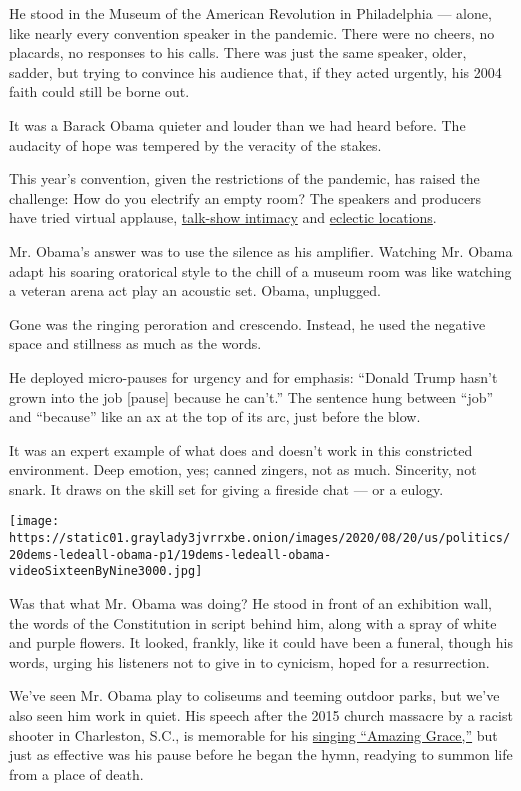 He stood in the Museum of the American Revolution in Philadelphia ---
alone, like nearly every convention speaker in the pandemic. There were
no cheers, no placards, no responses to his calls. There was just the
same speaker, older, sadder, but trying to convince his audience that,
if they acted urgently, his 2004 faith could still be borne out.

It was a Barack Obama quieter and louder than we had heard before. The
audacity of hope was tempered by the veracity of the stakes.

This year's convention, given the restrictions of the pandemic, has
raised the challenge: How do you electrify an empty room? The speakers
and producers have tried virtual applause,
\href{https://www.nytimes3xbfgragh.onion/2020/08/18/arts/television/dnc-michelle-obama.html}{talk-show
intimacy} and
\href{https://www.nytimes3xbfgragh.onion/2020/08/19/arts/television/dnc-roll-call-vote.html}{eclectic
locations}.

Mr. Obama's answer was to use the silence as his amplifier. Watching Mr.
Obama adapt his soaring oratorical style to the chill of a museum room
was like watching a veteran arena act play an acoustic set. Obama,
unplugged.

Gone was the ringing peroration and crescendo. Instead, he used the
negative space and stillness as much as the words.

He deployed micro-pauses for urgency and for emphasis: ``Donald Trump
hasn't grown into the job {[}pause{]} because he can't.'' The sentence
hung between ``job'' and ``because'' like an ax at the top of its arc,
just before the blow.

It was an expert example of what does and doesn't work in this
constricted environment. Deep emotion, yes; canned zingers, not as much.
Sincerity, not snark. It draws on the skill set for giving a fireside
chat --- or a eulogy.

\texttt{[image: https://static01.graylady3jvrrxbe.onion/images/2020/08/20/us/politics/20dems-ledeall-obama-p1/19dems-ledeall-obama-videoSixteenByNine3000.jpg]}

Was that what Mr. Obama was doing? He stood in front of an exhibition
wall, the words of the Constitution in script behind him, along with a
spray of white and purple flowers. It looked, frankly, like it could
have been a funeral, though his words, urging his listeners not to give
in to cynicism, hoped for a resurrection.

We've seen Mr. Obama play to coliseums and teeming outdoor parks, but
we've also seen him work in quiet. His speech after the 2015 church
massacre by a racist shooter in Charleston, S.C., is memorable for his
\href{https://www.youtube.com/watch?v=IN05jVNBs64}{singing ``Amazing
Grace,''} but just as effective was his pause before he began the hymn,
readying to summon life from a place of death.

